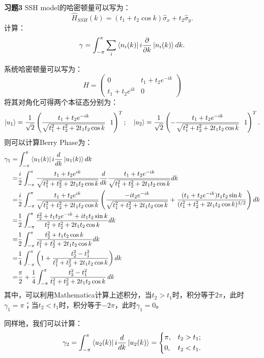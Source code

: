 \documentclass[reqno,a4paper,12pt]{amsart}
\begin{document}
\textbf{习题3} SSH model的哈密顿量可以写为：
\[
	\hat{H}_{SSH}(k) = (t_1 + t_2\cos k)\hat{\sigma}_x + t_2 \hat{\sigma}_y.
\]
计算：
\[
	\gamma = \int_{-\pi}^\pi \sum_i \bra{n_i(k)} i\frac{\partial}{\partial k} \ket{n_i(k)} dk. 
\]
\begin{tcolorbox}[breakable, colback = black!5!white, colframe = black]
系统哈密顿量可以写为：
\[
	H = \left( \begin{matrix}
		0 & t_1 + t_2e^{-ik} \\
		t_1+t_2e^{ik} & 0
	\end{matrix} \right)
\]
将其对角化可得两个本征态分别为：
\[
	\ket{u_1} = \frac{1}{\sqrt{2}}\left( \frac{t_1+t_2e^{-ik}}{\sqrt{t_1^2+t_2^2+2t_1t_2\cos k}} \ \ 1 \right)^T; \ \ \ \ket{u_2} = \frac{1}{\sqrt{2}}\left( -\frac{t_1+t_2e^{-ik}}{\sqrt{t_1^2+t_2^2+2t_1t_2\cos k}} \ \ 1 \right)^T.
\]
则可以计算Berry Phase为：
\begin{align*}
	\gamma_1 =& \int_{-\pi}^\pi \bra{u_1(k)} i\frac{d}{dk} \ket{u_1(k)} dk \\
	=& \frac{i}{2} \int_{-\pi}^\pi \frac{t_1+t_2e^{ik}}{\sqrt{t_1^2+t_2^2+2t_1t_2\cos k}} \frac{d}{dk} \frac{t_1+t_2e^{-ik}}{\sqrt{t_1^2+t_2^2+2t_1t_2\cos k}} dk \\
	=& \frac{i}{2} \int_{-\pi}^\pi \frac{t_1+t_2e^{ik}}{\sqrt{t_1^2+t_2^2+2t_1t_2\cos k}} \left( \frac{-it_2 e^{-ik}}{\sqrt{t_1^2+t_2^2+2t_1t_2\cos k}} + \frac{(t_1+t_2e^{-ik})t_1t_2\sin k}{(t_1^2+t_2^2+2t_1t_2\cos k)^{3/2}} \right)dk \\
	=& \frac{1}{2} \int_{-\pi}^\pi \frac{t_2^2 + t_1t_2e^{-ik} + it_1t_2\sin k}{t_1^2+t_2^2+2t_1t_2\cos k}dk \\
	=& \frac{1}{2} \int_{-\pi}^\pi \frac{t_2^2 + t_1t_2\cos k}{t_1^2+t_2^2+2t_1t_2\cos k} dk \\
	=& \frac{1}{4} \int_{-\pi}^\pi \left( 1 + \frac{t_2^2-t_1^2}{t_1^2+t_2^2+2t_1t_2\cos k} \right) dk \\
	=& \frac{\pi}{2} + \frac{1}{4} \int_{-\pi}^\pi \frac{t_2^2-t_1^2}{t_1^2+t_2^2+2t_1t_2\cos k} \,dk
\end{align*}
其中，可以利用Mathematica计算上述积分，当$t_2>t_1$时，积分等于$2\pi$，此时$\gamma_1 = \pi$；当$t_2<t_1$时，积分等于$-2\pi$，此时$\gamma_1 = 0$。

同样地，我们可以计算：
\[
	\gamma_2 = \int_{-\pi}^\pi \bra{u_2(k)} i\frac{d}{dk} \ket{u_2(k)} = \left\{ \begin{aligned}
		&\pi, & t_2>t_1; \\
		&0, & t_2<t_1.
	\end{aligned} \right.
\]
\end{tcolorbox}
\end{document}
